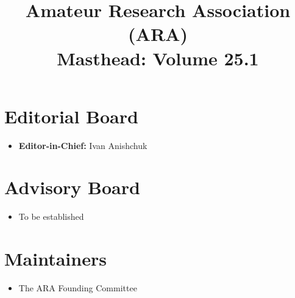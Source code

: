 \documentclass[conference, compsoc]{IEEEtran}
\title{Amateur Research Association (ARA) \\ Masthead: Volume 25.1}
\author{
    \IEEEauthorblockN{Ivan Anishchuk}
    \IEEEauthorblockA{
        ivan@ivananishchuk.net https://ivananishchuk.work \\
	ORCID \orcidicon{0009-0008-8729-6137}: 0009-0008-8729-6137 %
    }
}
\begin{document}
\IEEEoverridecommandlockouts
{}

\maketitle

\IEEEpubidadjcol

\section*{Editorial Board}
\begin{itemize}
    \item \textbf{Editor-in-Chief:} Ivan Anishchuk
\end{itemize}

\section*{Advisory Board}
\begin{itemize}
    \item To be established
\end{itemize}

\section*{Maintainers}
\begin{itemize}
    \item The ARA Founding Committee
\end{itemize}
\end{document}
